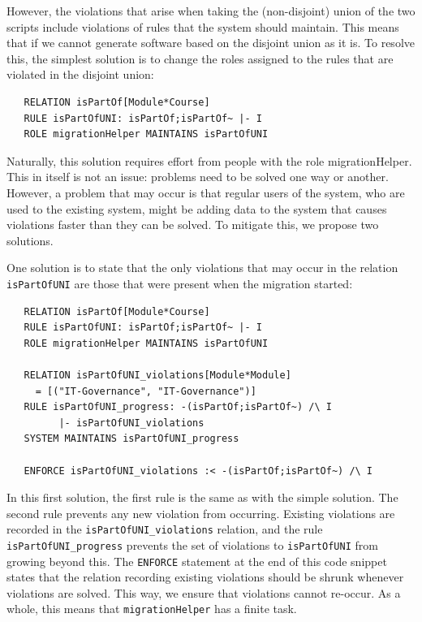 \documentclass{elsarticle}
\begin{document}
However, the violations that arise when taking the (non-disjoint) union of the two scripts include violations of rules that the system should maintain.
This means that if we cannot generate software based on the disjoint union as it is.
To resolve this, the simplest solution is to change the roles assigned to the rules that are violated in the disjoint union:
\begin{verbatim}
   RELATION isPartOf[Module*Course]
   RULE isPartOfUNI: isPartOf;isPartOf~ |- I
   ROLE migrationHelper MAINTAINS isPartOfUNI
\end{verbatim}

Naturally, this solution requires effort from people with the role migrationHelper.
This in itself is not an issue: problems need to be solved one way or another.
However, a problem that may occur is that regular users of the system, who are used to the existing system, might be adding data to the system that causes violations faster than they can be solved.
To mitigate this, we propose two solutions.

One solution is to state that the only violations that may occur in the relation \verb=isPartOfUNI= are those that were present when the migration started:
\begin{verbatim}
   RELATION isPartOf[Module*Course]
   RULE isPartOfUNI: isPartOf;isPartOf~ |- I
   ROLE migrationHelper MAINTAINS isPartOfUNI
   
   RELATION isPartOfUNI_violations[Module*Module]
     = [("IT-Governance", "IT-Governance")]
   RULE isPartOfUNI_progress: -(isPartOf;isPartOf~) /\ I
         |- isPartOfUNI_violations
   SYSTEM MAINTAINS isPartOfUNI_progress
   
   ENFORCE isPartOfUNI_violations :< -(isPartOf;isPartOf~) /\ I  
\end{verbatim}

In this first solution, the first rule is the same as with the simple solution.
The second rule prevents any new violation from occurring.
Existing violations are recorded in the \verb=isPartOfUNI_violations= relation, and the rule \verb=isPartOfUNI_progress= prevents the set of violations to \verb=isPartOfUNI= from growing beyond this.
The \verb=ENFORCE= statement at the end of this code snippet states that the relation recording existing violations should be shrunk whenever violations are solved.
This way, we ensure that violations cannot re-occur.
As a whole, this means that \verb=migrationHelper= has a finite task.
\end{document}

